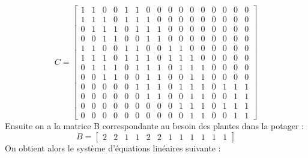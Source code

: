 \documentclass[french,a4paper]{article}
\begin{document}
\[C = \begin{bmatrix} 
1 & 1 & 0 & 0 & 1 & 1 & 0 & 0 & 0 & 0 & 0 & 0 & 0 & 0 & 0 & 0 \\ 
1 & 1 & 1 & 0 & 1 & 1 & 1 & 0 & 0 & 0 & 0 & 0 & 0 & 0 & 0 & 0 \\ 
0 & 1 & 1 & 1 & 0 & 1 & 1 & 1 & 0 & 0 & 0 & 0 & 0 & 0 & 0 & 0 \\ 
0 & 0 & 1 & 1 & 0 & 0 & 1 & 1 & 0 & 0 & 0 & 0 & 0 & 0 & 0 & 0 \\ 
1 & 1 & 0 & 0 & 1 & 1 & 0 & 0 & 1 & 1 & 0 & 0 & 0 & 0 & 0 & 0 \\ 
1 & 1 & 1 & 0 & 1 & 1 & 1 & 0 & 1 & 1 & 1 & 0 & 0 & 0 & 0 & 0 \\ 
0 & 1 & 1 & 1 & 0 & 1 & 1 & 1 & 0 & 1 & 1 & 1 & 0 & 0 & 0 & 0 \\ 
0 & 0 & 1 & 1 & 0 & 0 & 1 & 1 & 0 & 0 & 1 & 1 & 0 & 0 & 0 & 0 \\ 
0 & 0 & 0 & 0 & 0 & 1 & 1 & 1 & 0 & 1 & 1 & 1 & 0 & 1 & 1 & 1 \\ 
0 & 0 & 0 & 0 & 0 & 0 & 1 & 1 & 0 & 0 & 1 & 1 & 0 & 0 & 1 & 1 \\ 
0 & 0 & 0 & 0 & 0 & 0 & 0 & 0 & 0 & 1 & 1 & 1 & 0 & 1 & 1 & 1 \\ 
0 & 0 & 0 & 0 & 0 & 0 & 0 & 0 & 0 & 0 & 1 & 1 & 0 & 0 & 1 & 1
\end{bmatrix}\]
\newline
Ensuite on a la matrice B correspondante au besoin des plantes dans la potager :
\newline
\[B = \begin{bmatrix} 2 & 2 & 1 & 1 & 2 & 2 & 1 & 1 & 1 & 1 & 1 & 1 \end{bmatrix}\]
\newline
On obtient alors le système d'équations linéaires suivante :
\newline
\end{document}
